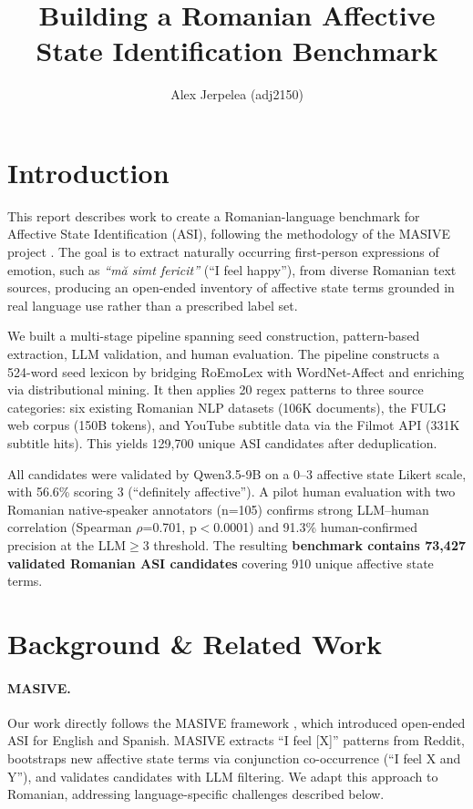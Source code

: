 \documentclass[11pt]{article}
\title{Building a Romanian Affective State Identification Benchmark}
\author{Alex Jerpelea (adj2150)}
\begin{document}
\maketitle

\section{Introduction}

This report describes work to create a Romanian-language benchmark for Affective State Identification (ASI), following the methodology of the MASIVE project \cite{masive2024}. The goal is to extract naturally occurring first-person expressions of emotion, such as \textit{``m\u{a} simt fericit''} (``I feel happy''), from diverse Romanian text sources, producing an open-ended inventory of affective state terms grounded in real language use rather than a prescribed label set.

We built a multi-stage pipeline spanning seed construction, pattern-based extraction, LLM validation, and human evaluation. The pipeline constructs a 524-word seed lexicon by bridging RoEmoLex \cite{roemolex2019} with WordNet-Affect \cite{strapparava2004} and enriching via distributional mining. It then applies 20 regex patterns to three source categories: six existing Romanian NLP datasets (106K documents), the FULG web corpus \cite{fulg2024} (150B tokens), and YouTube subtitle data via the Filmot API (331K subtitle hits). This yields 129,700 unique ASI candidates after deduplication.

All candidates were validated by Qwen3.5-9B \cite{qwen2024} on a 0--3 affective state Likert scale, with 56.6\% scoring 3 (``definitely affective''). A pilot human evaluation with two Romanian native-speaker annotators (n=105) confirms strong LLM--human correlation (Spearman $\rho$=0.701, p$<$0.0001) and 91.3\% human-confirmed precision at the LLM$\geq$3 threshold. The resulting \textbf{benchmark contains 73,427 validated Romanian ASI candidates} covering 910 unique affective state terms.


\section{Background \& Related Work}

\paragraph{MASIVE.} Our work directly follows the MASIVE framework \cite{masive2024}, which introduced open-ended ASI for English and Spanish. MASIVE extracts ``I feel [X]'' patterns from Reddit, bootstraps new affective state terms via conjunction co-occurrence (``I feel X and Y''), and validates candidates with LLM filtering. We adapt this approach to Romanian, addressing language-specific challenges described below.
\end{document}
